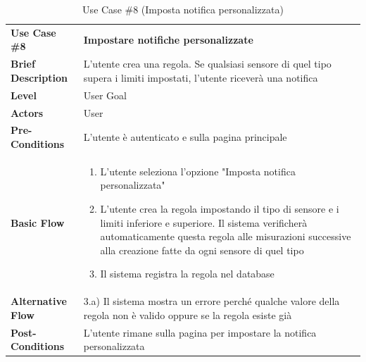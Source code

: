 	\begin{table}[h]
	\centering
	\setlength{\arrayrulewidth}{0.8pt} %
	
	\begin{tabular}{|l p{12cm}|}
		\hline
		
		\rowcolor{gray!25}
		\textbf{Use Case \#8} & \textbf{Impostare notifiche personalizzate} \\ 
		\textbf{Brief Description} &  L'utente crea una regola. Se qualsiasi sensore di quel tipo supera i limiti impostati, l'utente riceverà una notifica \\
		\textbf{Level} & User Goal \\ 
		\textbf{Actors} & User \\ 
		\textbf{Pre-Conditions} & L'utente è autenticato e sulla pagina principale \\ 
		\textbf{Basic Flow} & \begin{enumerate}[label=\arabic*), leftmargin=*, before=\vspace{-0.7cm}, after=\vspace{-0.4cm}]
			\item L'utente seleziona l'opzione "Imposta notifica personalizzata"
			\item L'utente crea la regola impostando il tipo di sensore e i limiti inferiore e superiore. Il sistema verificherà automaticamente questa regola alle misurazioni successive alla creazione fatte da ogni sensore di quel tipo
			\item Il sistema registra la regola nel database
		\end{enumerate} \\  
		\textbf{Alternative Flow} & 3.a) Il sistema mostra un errore perché qualche valore della regola non è valido oppure se la regola esiste già \\ 
		\textbf{Post-Conditions} & L'utente rimane sulla pagina per impostare la notifica personalizzata \\ 
		
		\hline
	\end{tabular}
	
	\vspace{0.2cm}
	\caption{Use Case \#8 (Imposta notifica personalizzata)}
	\end{table}
	\vspace{1cm} 
	